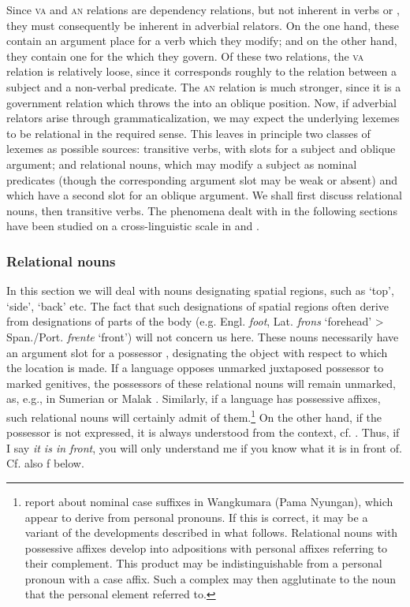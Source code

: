 Since \textsc{va} and \textsc{an} relations are dependency relations, but not inherent in verbs or \nps, they must consequently be inherent in adverbial relators. On the one hand, these contain an argument place for a verb which they modify; and on the other hand, they contain one for the \np which they govern. Of these two relations, the \textsc{va} relation is relatively loose, since it corresponds roughly to the relation between a subject and a non-verbal predicate. The \textsc{an} relation is much stronger, since it is a government relation which throws the \np into an oblique position. Now, if adverbial relators arise through grammaticalization, we may expect the underlying lexemes to be relational in the required sense. This leaves in principle two classes of lexemes as possible sources: transitive verbs, with slots for a subject and oblique argument; and relational nouns, which may modify a subject as nominal predicates (though the corresponding argument slot may be weak or absent) and which have a second slot for an oblique argument. We shall first discuss relational nouns, then transitive verbs. The phenomena dealt with in the following sections have been studied on a cross-linguistic scale in \citet{Kahr1975,Kahr1976} and \citet[esp.~240]{Austerlitz1980}.

\subsubsection{Relational nouns}
In this section we will deal with nouns designating spatial regions, such as ‘top’, ‘side’, ‘back’ etc. The fact that such designations of spatial regions often derive from designations of parts of the body (e.g. Engl. \textit{foot}, Lat. \textit{frons} ‘forehead’ {\textgreater} Span./Port. \textit{frente} ‘front’) will not concern us here. These nouns necessarily have an argument slot for a possessor \np, designating the object with respect to which the location is made. If a language opposes unmarked juxtaposed possessor \nps to marked genitives, the possessors of these relational nouns will remain unmarked, as, e.g., in Sumerian or Malak \citep[389]{MallinsonEtAl1981}. Similarly, if a language has possessive affixes, such relational nouns will certainly admit of them.\footnote{\citet[50f]{MallinsonEtAl1981} report about nominal case suffixes in Wangkumara (Pama Nyungan), which appear to derive from personal pronouns. If this is correct, it may be a variant of the developments described in what follows. Relational nouns with possessive affixes develop into adpositions with personal affixes referring to their complement. This product may be indistinguishable from a personal pronoun with a case affix. Such a complex may then agglutinate to the noun that the personal element referred to.} On the other hand, if the possessor is not expressed, it is always understood from the context, cf. \citet[§5.2.3.1]{Seiler1983}. Thus, if I say \textit{it is in front}, you will only understand me if you know what it is in front of. Cf. also f below.

